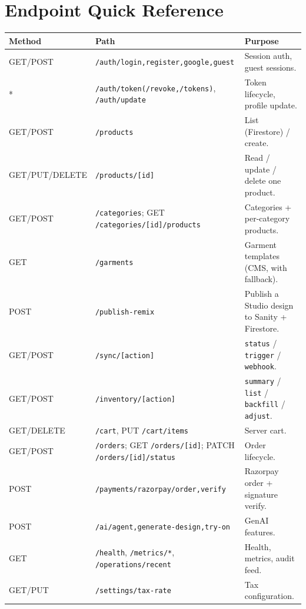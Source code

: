 \documentclass[11pt,a4paper]{report}
\newcommand{\code}[1]{\texttt{#1}}
\begin{document}
\chapter{Endpoint Quick Reference}
{\footnotesize
\begin{longtable}{@{}llp{7.2cm}@{}}
\toprule
\textbf{Method} & \textbf{Path} & \textbf{Purpose}\\
\midrule
\endhead
GET/POST & \code{/auth/login,register,google,guest} & Session auth, guest sessions.\\
* & \code{/auth/token(/revoke,/tokens)}, \code{/auth/update} & Token lifecycle, profile update.\\
GET/POST & \code{/products} & List (Firestore) / create.\\
GET/PUT/DELETE & \code{/products/[id]} & Read / update / delete one product.\\
GET/POST & \code{/categories}; GET \code{/categories/[id]/products} & Categories + per-category products.\\
GET & \code{/garments} & Garment templates (CMS, with fallback).\\
POST & \code{/publish-remix} & Publish a Studio design to Sanity + Firestore.\\
GET/POST & \code{/sync/[action]} & \code{status} / \code{trigger} / \code{webhook}.\\
GET/POST & \code{/inventory/[action]} & \code{summary} / \code{list} / \code{backfill} / \code{adjust}.\\
GET/DELETE & \code{/cart}, PUT \code{/cart/items} & Server cart.\\
GET/POST & \code{/orders}; GET \code{/orders/[id]}; PATCH \code{/orders/[id]/status} & Order lifecycle.\\
POST & \code{/payments/razorpay/order,verify} & Razorpay order + signature verify.\\
POST & \code{/ai/agent,generate-design,try-on} & GenAI features.\\
GET & \code{/health}, \code{/metrics/*}, \code{/operations/recent} & Health, metrics, audit feed.\\
GET/PUT & \code{/settings/tax-rate} & Tax configuration.\\
\bottomrule
\end{longtable}
}
\end{document}
